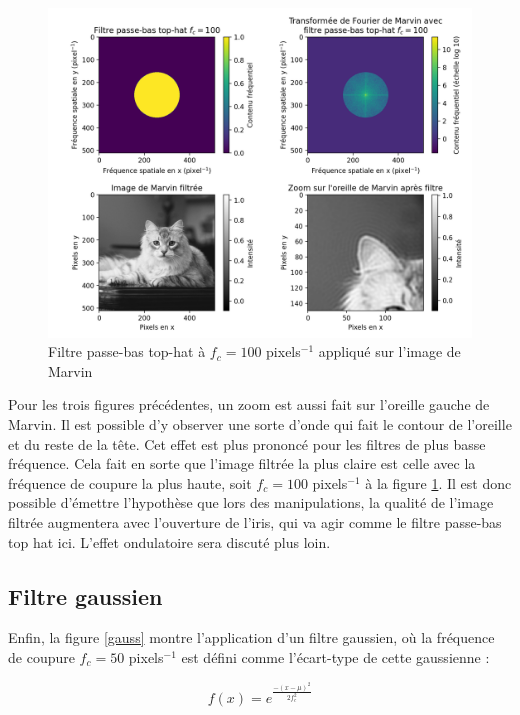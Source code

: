 \documentclass[11pt,letterpaper]{article}
\begin{document}
\begin{figure}[H]
  \centering
  \includegraphics[scale=0.7]{marvin_post_filter_fc_100.png}
  \caption{Filtre passe-bas top-hat à $f_c = 100$ pixels$^{-1}$ appliqué sur l'image de Marvin}
  \label{fc100}
\end{figure}

Pour les trois figures précédentes, un zoom est aussi fait sur l'oreille gauche de Marvin. Il est possible d'y observer une sorte d'onde qui fait le contour de l'oreille et du reste de la tête. Cet effet est plus prononcé pour les filtres de plus basse fréquence. Cela fait en sorte que l'image filtrée la plus claire est celle avec la fréquence de coupure la plus haute, soit $f_c=100$ pixels$^{-1}$ à la figure \ref{fc100}. Il est donc possible d'émettre l'hypothèse que lors des manipulations, la qualité de l'image filtrée augmentera avec l'ouverture de l'iris, qui va agir comme  le filtre passe-bas top hat ici. L'effet ondulatoire sera discuté plus loin.

\subsection{Filtre gaussien}

Enfin, la figure \ref{gauss} montre l'application d'un filtre gaussien, où la fréquence de coupure $f_c = 50$ pixels$^{-1}$ est défini comme l'écart-type de cette gaussienne :

\begin{equation}
  f(x) = e^{\frac{-\left( x-\mu \right)^{2}}{2f_c^2}}
\end{equation}
\end{document}
